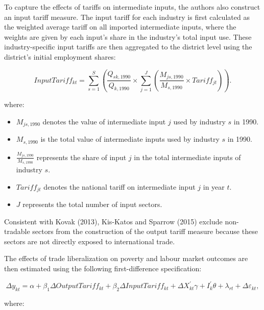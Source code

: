 \documentclass[
  manuscript=article,
  layout=publish,
  year=2026,
  volume=1,
]{den}
\providecommand{\tightlist}{%
  \setlength{\itemsep}{0pt}\setlength{\parskip}{0pt}}
\begin{document}
To capture the effects of tariffs on intermediate inputs, the authors
also construct an input tariff measure. The input tariff for each
industry is first calculated as the weighted average tariff on all
imported intermediate inputs, where the weights are given by each
input's share in the industry's total input use. These industry-specific
input tariffs are then aggregated to the district level using the
district's initial employment shares:

\[
InputTariff_{kt}
=
\sum_{s=1}^{S}
\left(
\frac{Q_{sk,1990}}{Q_{k,1990}}
\times
\sum_{j=1}^{J}
\left(
\frac{M_{js,1990}}{M_{s,1990}}
\times
Tariff_{jt}
\right)
\right).
\]

where:

\begin{itemize}
\tightlist
\item
  \(M_{js,1990}\) denotes the value of intermediate input \(j\) used by
  industry \(s\) in 1990.
\item
  \(M_{s,1990}\) is the total value of intermediate inputs used by
  industry \(s\) in 1990.
\item
  \(\frac{M_{js,1990}}{M_{s,1990}}\) represents the share of input \(j\)
  in the total intermediate inputs of industry \(s\).
\item
  \(Tariff_{jt}\) denotes the national tariff on intermediate input
  \(j\) in year \(t\).
\item
  \(J\) represents the total number of input sectors.
\end{itemize}

Consistent with Kovak (2013), Kis-Katos and Sparrow (2015) exclude
non-tradable sectors from the construction of the output tariff measure
because these sectors are not directly exposed to international trade.

The effects of trade liberalization on poverty and labour market
outcomes are then estimated using the following first-difference
specification:

\[
\Delta y_{kt}
=
\alpha
+
\beta_1
\Delta OutputTariff_{kt}
+
\beta_2
\Delta InputTariff_{kt}
+
\Delta X_{kt}^{\prime}\gamma
+
I_k^{\prime}\theta
+
\lambda_{rt}
+
\Delta\varepsilon_{kt},
\]

where:
\end{document}
